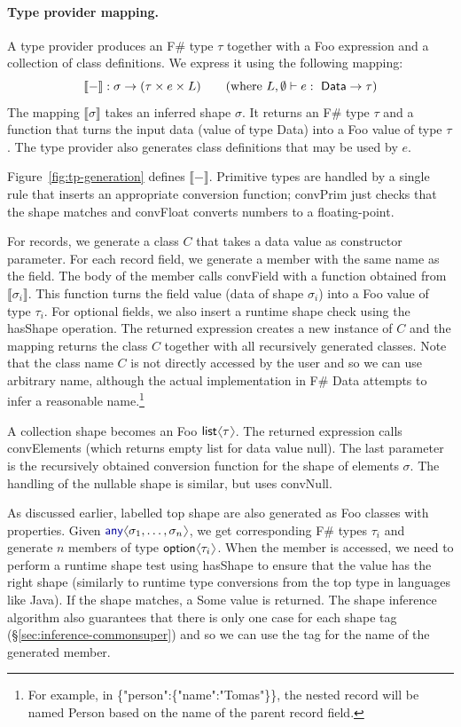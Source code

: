 \documentclass[10pt,preprint,blind,clearpagebib]{sigplanconf}
\newcommand{\langl}{\begin{picture}(4.5,7)
\put(1.1,2.5){\rotatebox{60}{\line(1,0){5.5}}}
\put(1.1,2.5){\rotatebox{300}{\line(1,0){5.5}}}
\end{picture}}
\newcommand{\rangl}{\begin{picture}(4.5,7)
\put(.9,2.5){\rotatebox{120}{\line(1,0){5.5}}}
\put(.9,2.5){\rotatebox{240}{\line(1,0){5.5}}}
\end{picture}}
\newcommand{\kvd}[1]{\textnormal{\textcolor{kvdclr}{\sffamily #1}}}
\newcommand{\str}[1]{\textnormal{\textcolor{strclr}{\sffamily "#1"}}}
\newcommand{\ident}[1]{\textnormal{\sffamily #1}}
\newcommand{\sem}[1]{\llbracket #1 \rrbracket}
\begin{document}
\paragraph{Type provider mapping.}
A type provider produces an F\# type $\tau$ together with a Foo expression and a collection of 
class definitions. We express it using the following mapping:
%
\begin{equation*}
\sem{-} : \sigma \rightarrow (\tau \times e \times L) \qquad (\textnormal{where}~L,\emptyset \vdash e:\ident{Data}\rightarrow\tau)
\end{equation*}
%
The mapping $\sem{\sigma}$ takes an inferred shape $\sigma$. It returns an F\# type $\tau$ and
a function that turns the input data (value of type \ident{Data}) into a Foo value of type $\tau$. 
The type provider also generates class definitions that may be used by $e$. 

Figure~\ref{fig:tp-generation} defines $\sem{-}$. Primitive types are handled by a single rule that
inserts an appropriate conversion function; \ident{convPrim} just checks that the shape matches
and \ident{convFloat} converts numbers to a floating-point.

For records, we generate a class $C$ that takes a data value as constructor parameter. For each 
record field, we generate a member with the same name as the field.
The body of the member calls \ident{convField}
with a function obtained from $\sem{\sigma_i}$. This function turns the field value (data of shape
$\sigma_i$) into a Foo value of type $\tau_i$. For optional fields, we also insert a runtime shape
check using the \ident{hasShape} operation. The returned expression creates a new instance of 
$C$ and the mapping returns the class $C$ together with all recursively generated classes. Note that 
the class name $C$ is not directly accessed by the user and so we can use arbitrary name, although the 
actual implementation in F\# Data attempts to infer a reasonable name.\footnote{For example, in 
\ident{\{\str{person}:\{\str{name}:\str{Tomas}\}\}}, the nested record will be named \ident{Person}
based on the name of the parent record field.}

A collection shape becomes an Foo $\ident{list}\langl\tau\rangl$. The returned expression calls \ident{convElements}
(which returns empty list for data value \kvd{null}). The last parameter is the recursively obtained
conversion function for the shape of elements $\sigma$. The handling of the nullable shape is similar,
but uses \ident{convNull}.

As discussed earlier, labelled top shape are also generated as Foo classes with properties. Given 
$\kvd{any}\langl\sigma_1, \ldots, \sigma_n\rangl$, we get corresponding F\# types $\tau_i$ and generate 
$n$ members of type $\ident{option}\langl \tau_i\rangl$. When the member is accessed, we need to perform
a runtime shape test using \ident{hasShape} to ensure that the value has the right shape (similarly to runtime 
type conversions from the top type in languages like Java). If the shape matches, a \ident{Some} value is 
returned. The shape inference algorithm also guarantees that there is only one case for each shape tag 
(\S\ref{sec:inference-commonsuper}) and so we can use the tag for the name of the generated member.
\end{document}
